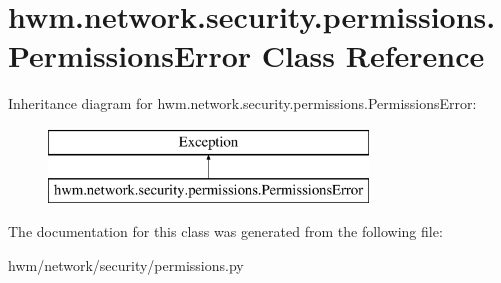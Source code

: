 \hypertarget{classhwm_1_1network_1_1security_1_1permissions_1_1_permissions_error}{\section{hwm.\-network.\-security.\-permissions.\-Permissions\-Error Class Reference}
\label{classhwm_1_1network_1_1security_1_1permissions_1_1_permissions_error}
}
Inheritance diagram for hwm.\-network.\-security.\-permissions.\-Permissions\-Error\-:\begin{figure}[H]
\begin{center}
\leavevmode
\includegraphics[height=2.000000cm]{classhwm_1_1network_1_1security_1_1permissions_1_1_permissions_error}
\end{center}
\end{figure}


The documentation for this class was generated from the following file\-:\begin{DoxyCompactItemize}
\item 
hwm/network/security/permissions.\-py\end{DoxyCompactItemize}

